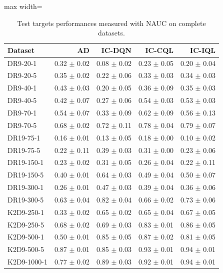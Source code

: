 \documentclass{article}
\begin{document}
\begin{table}[ht]
    \label{tab:}
    \begin{center}
    \caption{Test targets performances measured with NAUC on complete datasets.}
    \begin{small}
    \begin{adjustbox}{max width=\columnwidth}
		\begin{tabular}{l|rrrr}
		\toprule
	\textbf{Dataset} & \textbf{AD} & \textbf{IC-DQN} & \textbf{IC-CQL} & \textbf{IC-IQL}\\
\midrule
DR9-20-1 & 0.32 $\pm$ 0.02 & 0.08 $\pm$ 0.02 & 0.23 $\pm$ 0.05 & 0.20 $\pm$ 0.04\\
DR9-20-5 & 0.35 $\pm$ 0.02 & 0.22 $\pm$ 0.06 & 0.33 $\pm$ 0.03 & 0.34 $\pm$ 0.03\\
DR9-40-1 & 0.43 $\pm$ 0.03 & 0.20 $\pm$ 0.05 & 0.36 $\pm$ 0.09 & 0.35 $\pm$ 0.03\\
DR9-40-5 & 0.42 $\pm$ 0.07 & 0.27 $\pm$ 0.06 & 0.54 $\pm$ 0.03 & 0.53 $\pm$ 0.03\\
DR9-70-1 & 0.54 $\pm$ 0.07 & 0.33 $\pm$ 0.09 & 0.62 $\pm$ 0.09 & 0.56 $\pm$ 0.13\\
DR9-70-5 & 0.68 $\pm$ 0.02 & 0.72 $\pm$ 0.11 & 0.78 $\pm$ 0.04 & 0.79 $\pm$ 0.07\\
DR19-75-1 & 0.16 $\pm$ 0.01 & 0.13 $\pm$ 0.05 & 0.18 $\pm$ 0.00 & 0.10 $\pm$ 0.02\\
DR19-75-5 & 0.22 $\pm$ 0.11 & 0.39 $\pm$ 0.03 & 0.31 $\pm$ 0.00 & 0.23 $\pm$ 0.06\\
DR19-150-1 & 0.23 $\pm$ 0.02 & 0.31 $\pm$ 0.05 & 0.26 $\pm$ 0.04 & 0.22 $\pm$ 0.11\\
DR19-150-5 & 0.40 $\pm$ 0.01 & 0.64 $\pm$ 0.03 & 0.49 $\pm$ 0.04 & 0.50 $\pm$ 0.07\\
DR19-300-1 & 0.26 $\pm$ 0.01 & 0.47 $\pm$ 0.03 & 0.39 $\pm$ 0.04 & 0.36 $\pm$ 0.06\\
DR19-300-5 & 0.63 $\pm$ 0.04 & 0.82 $\pm$ 0.04 & 0.66 $\pm$ 0.02 & 0.73 $\pm$ 0.06\\
K2D9-250-1 & 0.33 $\pm$ 0.02 & 0.65 $\pm$ 0.02 & 0.65 $\pm$ 0.04 & 0.67 $\pm$ 0.05\\
K2D9-250-5 & 0.68 $\pm$ 0.02 & 0.69 $\pm$ 0.03 & 0.83 $\pm$ 0.01 & 0.86 $\pm$ 0.05\\
K2D9-500-1 & 0.50 $\pm$ 0.01 & 0.85 $\pm$ 0.05 & 0.87 $\pm$ 0.02 & 0.81 $\pm$ 0.05\\
K2D9-500-5 & 0.87 $\pm$ 0.01 & 0.85 $\pm$ 0.03 & 0.93 $\pm$ 0.01 & 0.94 $\pm$ 0.01\\
K2D9-1000-1 & 0.77 $\pm$ 0.02 & 0.89 $\pm$ 0.03 & 0.92 $\pm$ 0.01 & 0.94 $\pm$ 0.01\\

\end{tabular}
\end{adjustbox}
\end{small}
\end{center}
\end{table}
\end{document}
